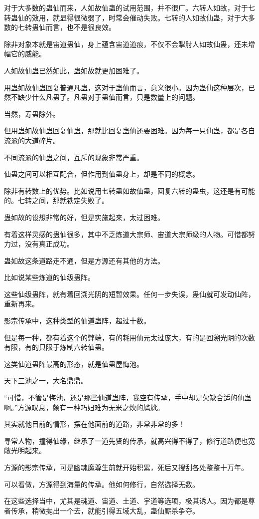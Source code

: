 \begin{this_body}
对于大多数的蛊仙而来，人如故仙蛊的试用范围，并不很广。六转人如故，对于七转蛊仙的效用，就显得很微弱了，时常会催动失败。七转的人如故仙蛊，对于大多数的七转蛊仙而言，也不是很良效。

除非对象本就是宙道蛊仙，身上蕴含宙道道痕，不仅不会掣肘人如故仙蛊，还未增幅它的威能。

人如故仙蛊已然如此，蛊如故就更加困难了。

用蛊如故仙蛊回复普通凡蛊，这对于蛊仙而言，意义很小。因为蛊仙这种层次，已然不缺少什么凡蛊了。凡蛊对于蛊仙而言，只是数量上的问题。

当然，寿蛊除外。

但用蛊如故仙蛊回复仙蛊，那就比回复蛊仙还要困难。因为每一只仙蛊，都是各自流派的大道碎片。

不同流派的仙蛊之间，互斥的现象非常严重。

仙蛊之间可以相互配合，但作用到仙蛊身上，却是不同的概念。

除非有转数上的优势。比如说用七转蛊如故仙蛊，回复六转的蛊虫，这还是有可能的。七转之间，那就铁定失败了。

蛊如故的设想非常的好，但是实施起来，太过困难。

有着这样灵感的蛊仙很多，其中不乏炼道大宗师、宙道大宗师级的人物。可惜都努力过，没有真正成功。

蛊如故这条道路走不通，但是方源还有其他的方法。

比如说某些炼道的仙级蛊阵。

这些仙级蛊阵，就有着回溯光阴的短暂效果。任何一步失误，蛊仙就可发动仙阵，重新再来。

影宗传承中，这种类型的仙道蛊阵，超过十数。

但是每一种，都有着这个的弊端，有的耗用仙元太过庞大，有的是回溯光阴的次数有限，有的只限于炼制六转仙蛊。

这类仙道蛊阵最高的形态，就是仙蛊屋悔池。

天下三池之一，大名鼎鼎。

“可惜，不管是悔池，还是那些仙道蛊阵，我空有传承，手中却是欠缺合适的仙蛊啊。”方源叹息，颇有一种巧妇难为无米之炊的尴尬。

其实就他目前的情形，摆在他面前的道路，非常非常的多！

寻常人物，撞得仙缘，继承了一道先贤的传承，就高兴得不得了，修行道路便也宽敞光明起来。

方源的影宗传承，可是幽魂魔尊生前就开始积累，死后又搜刮各处整整十万年。

可以看做，方源得到海量的传承。他如何修行，自然选择无数。

在这些选择当中，尤其是魂道、宙道、土道、宇道等选项，极其诱人。因为都是尊者传承，稍微抛出一个去，就能引得五域大乱，蛊仙厮杀争夺。


\end{this_body}
